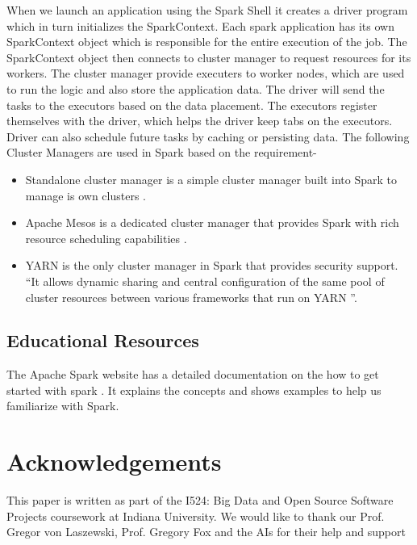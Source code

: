 \documentclass[9pt,twocolumn,twoside]{styles/osajnl}
\begin{document}
When we launch an application using the Spark Shell it creates a driver program which in turn initializes the SparkContext. Each spark application has its own SparkContext object which is responsible for the entire execution of the job. The SparkContext  object then connects to cluster manager to request resources for its workers. The cluster manager provide executers to worker nodes, which are used to run the logic and also store the application data. The driver will send the tasks to the executors based on the data placement. The executors register themselves with the driver, which helps the driver keep tabs on the executors. Driver can also schedule future tasks by caching or persisting data.
The following Cluster Managers are used in Spark based on the requirement-
\begin{itemize}
    \item Standalone cluster manager is a simple cluster manager built into Spark to manage is own clusters \cite{www-spark-cluster}.
    \item Apache Mesos is a dedicated cluster manager that provides Spark with rich resource scheduling capabilities \cite{www-spark-cluster}.
    \item YARN is the only cluster manager in Spark that provides security support. “It allows dynamic sharing and central configuration of the same pool of cluster resources between various frameworks that run on YARN \cite{www-spark-2}”.
\end{itemize}

\subsection{Educational Resources}
 The Apache Spark website has a detailed documentation on the how to get started with spark \cite{www-apache-spark}. It explains the concepts and shows examples to help us familiarize with Spark.
 
\section*{Acknowledgements}

This paper is written as part of the I524: Big Data and Open Source Software Projects coursework at Indiana University. We would like to thank our Prof. Gregor von Laszewski, Prof. Gregory Fox and the AIs for their help and support



 
\end{document}
